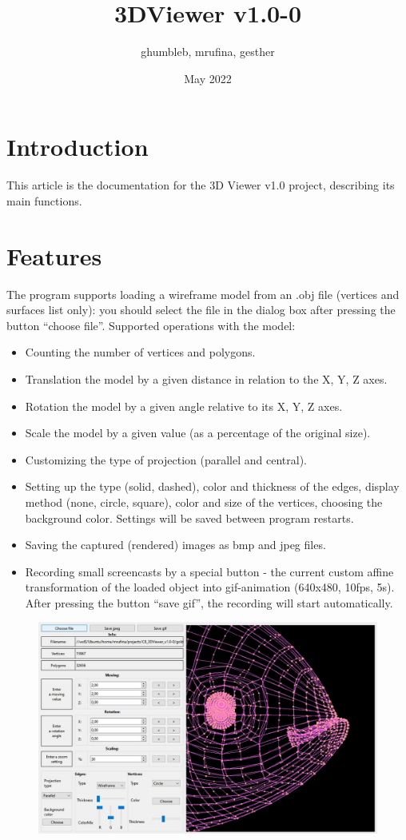 \documentclass{article}
\title{3DViewer v1.0-0}
\author{ghumbleb, mrufina, gesther}
\date{May 2022}
\begin{document}
\maketitle

\section{Introduction}
{This article is the documentation for the 3D Viewer v1.0 project, describing its main functions.}

\section{Features}
{The program supports loading a wireframe model from an .obj file (vertices and surfaces list only): you should select the file in the dialog box after pressing the button “choose file”. Supported operations with the model:}

\begin{itemize}

\item Counting the number of vertices and polygons.
\item Translation the model by a given distance in relation to the X, Y, Z axes.
\item Rotation the model by a given angle relative to its X, Y, Z axes.
\item Scale the model by a given value (as a percentage of the original size).
\item Customizing the type of projection (parallel and central).
\item Setting up the type (solid, dashed), color and thickness of the edges, display method (none, circle, square), color and size of the vertices, choosing the background color. Settings will be saved between program restarts.
\item Saving the captured (rendered) images as bmp and jpeg files.
\item Recording small screencasts by a special button - the current custom affine transformation of the loaded object into gif-animation (640x480, 10fps, 5s). After pressing the button “save gif”, the recording will start automatically.

\end{itemize}

\begin{figure}[h]
\centering\includegraphics[scale=0.5]{example.png}
\label{fig:image}
\end{figure}
\end{document}
